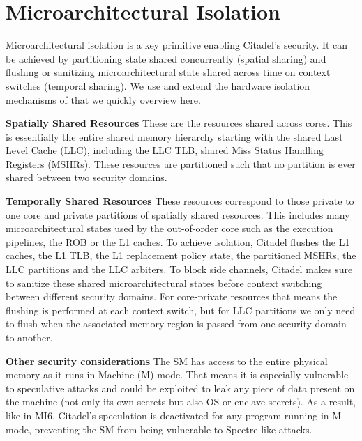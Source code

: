 \section{Microarchitectural Isolation}
\label{sec:hardwaremechanisms}

Microarchitectural isolation is a key primitive enabling Citadel's security.
It can be achieved by partitioning state shared concurrently (spatial sharing) and flushing or sanitizing microarchitectural state shared across time on context switches (temporal sharing).
We use and extend the hardware isolation mechanisms of \cite{bourgeat2019mi6} that we quickly overview here.

\textbf{Spatially Shared Resources}
\label{sec:mi6detailsspacial}
These are the resources shared across cores.
This is essentially the entire shared memory hierarchy starting with the shared Last Level Cache (LLC), including the LLC TLB,  shared Miss Status Handling Registers (MSHRs).
These resources are partitioned such that no partition is ever shared between two security domains.

\textbf{Temporally Shared Resources}
These resources correspond to those private to one core and private partitions of spatially shared resources.
This includes many microarchitectural states used by the out-of-order core such as the execution pipelines, the ROB or the L1 caches.
To achieve isolation, Citadel flushes the L1 caches, the L1 TLB, the L1 replacement policy state, the partitioned MSHRs, the LLC partitions and the LLC arbiters.
To block side channels, Citadel makes sure to sanitize these shared microarchitectural states before context switching between different security domains.
For core-private resources that means the flushing is performed at each context switch, but for LLC partitions we only need to flush when the associated memory region is passed from one security domain to another.

\textbf{Other security considerations}
The SM has access to the entire physical memory as it runs in Machine (M) mode.
That means it is especially vulnerable to speculative attacks and could be exploited to leak any piece of data present on the machine (not only its own secrets but also OS or enclave secrets).
As a result, like in MI6, Citadel's speculation is deactivated for any program running in M mode, preventing the SM from being vulnerable to Spectre-like attacks.